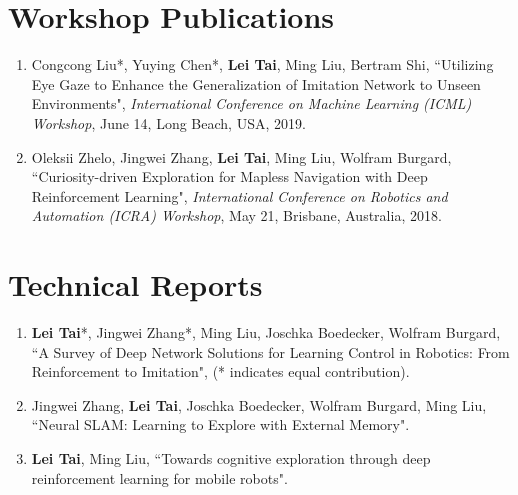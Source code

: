 \section*{Workshop Publications}
\begin{enumerate}
	\item Congcong Liu*, Yuying Chen*, {\bf Lei Tai}, Ming Liu, Bertram Shi, ``Utilizing Eye Gaze to Enhance the Generalization of Imitation Network to Unseen Environments", \emph{International Conference on Machine Learning (ICML) Workshop}, June 14, Long Beach, USA, 2019.
	\item Oleksii Zhelo, Jingwei Zhang, {\bf Lei Tai}, Ming Liu, Wolfram Burgard, ``Curiosity-driven Exploration for Mapless Navigation with Deep Reinforcement Learning", \emph{International Conference on Robotics and Automation (ICRA) Workshop}, May 21, Brisbane, Australia, 2018.
\end{enumerate}
\section*{Technical Reports}
\begin{enumerate}
	\item {\bf Lei Tai}*, Jingwei Zhang*, Ming Liu, Joschka Boedecker, Wolfram Burgard, ``A Survey of Deep Network Solutions for Learning Control in Robotics: From Reinforcement to Imitation", (* indicates equal contribution).
	\item Jingwei Zhang, {\bf Lei Tai}, Joschka Boedecker, Wolfram Burgard, Ming Liu, ``Neural SLAM: Learning to Explore with External Memory".
	\item {\bf Lei Tai}, Ming Liu, ``Towards cognitive exploration through deep reinforcement learning for mobile robots".
\end{enumerate}
